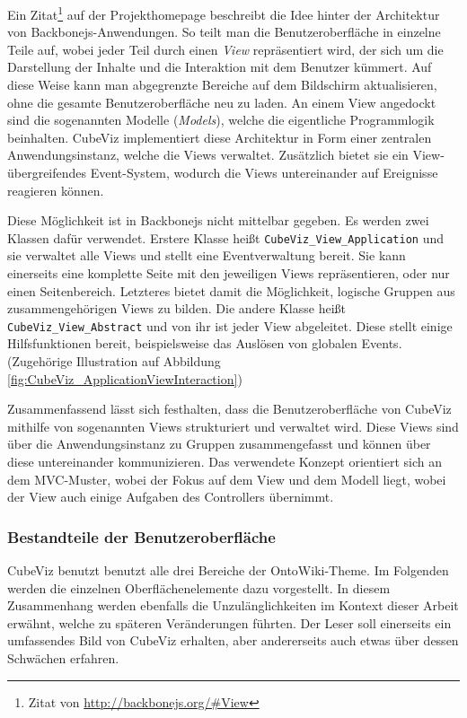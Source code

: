 \documentclass[11pt]{article}
\begin{document}
\noindent
Ein Zitat\footnote{Zitat von \url{http://backbonejs.org/\#View}} auf der Projekthomepage beschreibt die Idee hinter der Architektur von Backbonejs-Anwendungen. So teilt man die Benutzeroberfläche in einzelne Teile auf, wobei jeder Teil durch einen \textit{View} repräsentiert wird, der sich um die Darstellung der Inhalte und die Interaktion mit dem Benutzer kümmert. Auf diese Weise kann man abgegrenzte Bereiche auf dem Bildschirm aktualisieren, ohne die gesamte Benutzeroberfläche neu zu laden. An einem View angedockt sind die sogenannten Modelle (\textit{Models}), welche die eigentliche Programmlogik beinhalten. CubeViz implementiert diese Architektur in Form einer zentralen Anwendungsinstanz, welche die Views verwaltet. Zusätzlich bietet sie ein View-übergreifendes Event-System, wodurch die Views untereinander auf Ereignisse reagieren können. 


\newpage 
\noindent
Diese Möglichkeit ist in Backbonejs nicht mittelbar gegeben. Es werden zwei Klassen dafür verwendet. Erstere Klasse heißt \verb|CubeViz_View_Application| und sie verwaltet alle Views und stellt eine Eventverwaltung bereit. Sie kann einerseits eine komplette Seite mit den jeweiligen Views repräsentieren, oder nur einen Seitenbereich. Letzteres bietet damit die Möglichkeit, logische Gruppen aus zusammengehörigen Views zu bilden. Die andere Klasse heißt \verb|CubeViz_View_Abstract| und von ihr ist jeder View abgeleitet. Diese stellt einige Hilfsfunktionen bereit, beispielsweise das Auslösen von globalen Events. (Zugehörige Illustration auf Abbildung \ref{fig:CubeViz_ApplicationViewInteraction})

Zusammenfassend lässt sich festhalten, dass die Benutzeroberfläche von CubeViz mithilfe von sogenannten Views strukturiert und verwaltet wird. Diese Views sind über die Anwendungsinstanz zu Gruppen zusammengefasst und können über diese untereinander kommunizieren. Das verwendete Konzept orientiert sich an dem MVC-Muster, wobei der Fokus auf dem View und dem Modell liegt, wobei der View auch einige Aufgaben des Controllers übernimmt.


%
%
\newpage
\subsubsection{Bestandteile der Benutzeroberfläche}
\label{sec:chapterCVUIParts}

CubeViz benutzt benutzt alle drei Bereiche der OntoWiki-Theme. Im Folgenden werden die einzelnen Oberflächenelemente dazu vorgestellt. In diesem Zusammenhang werden ebenfalls die Unzulänglichkeiten im Kontext dieser Arbeit erwähnt, welche zu späteren Veränderungen führten. Der Leser soll einerseits ein umfassendes Bild von CubeViz erhalten, aber andererseits auch etwas über dessen Schwächen erfahren.
\end{document}
